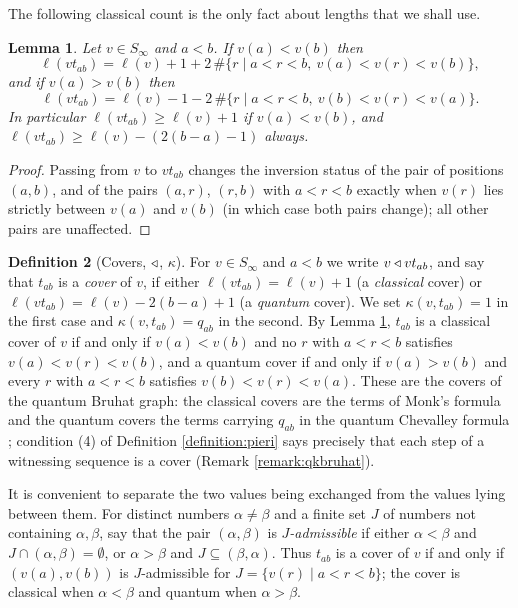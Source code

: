\documentclass{amsart}
\newtheorem{lemma}{Lemma}[section]
\theoremstyle{definition}
\newtheorem{definition}[lemma]{Definition}
\theoremstyle{remark}
\numberwithin{equation}{section}
\begin{document}
The following classical count is the only fact about lengths that we shall use.

\begin{lemma} \label{lemma:lengthchange}
Let $v\in S_\infty$ and $a<b$. If $v(a)<v(b)$ then
$$\ell(vt_{ab})=\ell(v)+1+2\,\#\{r\mid a<r<b,\ v(a)<v(r)<v(b)\},$$
and if $v(a)>v(b)$ then
$$\ell(vt_{ab})=\ell(v)-1-2\,\#\{r\mid a<r<b,\ v(b)<v(r)<v(a)\}.$$
In particular $\ell(vt_{ab})\geq\ell(v)+1$ if $v(a)<v(b)$, and $\ell(vt_{ab})\geq\ell(v)-(2(b-a)-1)$ always.
\end{lemma}
\begin{proof}
Passing from $v$ to $vt_{ab}$ changes the inversion status of the pair of positions $(a,b)$, and of the pairs $(a,r)$, $(r,b)$ with $a<r<b$ exactly when $v(r)$ lies strictly between $v(a)$ and $v(b)$ (in which case both pairs change); all other pairs are unaffected.
\end{proof}

\begin{definition}[Covers, $\triangleleft$, $\kappa$] \label{def:cover}
For $v\in S_\infty$ and $a<b$ we write $v\triangleleft vt_{ab}$, and say that $t_{ab}$ is a \emph{cover} of $v$, if either $\ell(vt_{ab})=\ell(v)+1$ (a \emph{classical} cover) or $\ell(vt_{ab})=\ell(v)-2(b-a)+1$ (a \emph{quantum} cover). We set $\kappa(v,t_{ab})=1$ in the first case and $\kappa(v,t_{ab})=q_{ab}$ in the second. By Lemma \ref{lemma:lengthchange}, $t_{ab}$ is a classical cover of $v$ if and only if $v(a)<v(b)$ and no $r$ with $a<r<b$ satisfies $v(a)<v(r)<v(b)$, and a quantum cover if and only if $v(a)>v(b)$ and every $r$ with $a<r<b$ satisfies $v(b)<v(r)<v(a)$. These are the covers of the quantum Bruhat graph: the classical covers are the terms of Monk's formula and the quantum covers the terms carrying $q_{ab}$ in the quantum Chevalley formula \cite{fulton2004quantum,buch2003qmonk}; condition (4) of Definition \ref{definition:pieri} says precisely that each step of a witnessing sequence is a cover (Remark \ref{remark:qkbruhat}).
\end{definition}

It is convenient to separate the two values being exchanged from the values lying between them. For distinct numbers $\alpha\neq\beta$ and a finite set $J$ of numbers not containing $\alpha,\beta$, say that the pair $(\alpha,\beta)$ is \emph{$J$-admissible} if either $\alpha<\beta$ and $J\cap(\alpha,\beta)=\emptyset$, or $\alpha>\beta$ and $J\subseteq(\beta,\alpha)$. Thus $t_{ab}$ is a cover of $v$ if and only if $(v(a),v(b))$ is $J$-admissible for $J=\{v(r)\mid a<r<b\}$; the cover is classical when $\alpha<\beta$ and quantum when $\alpha>\beta$.
\end{document}

